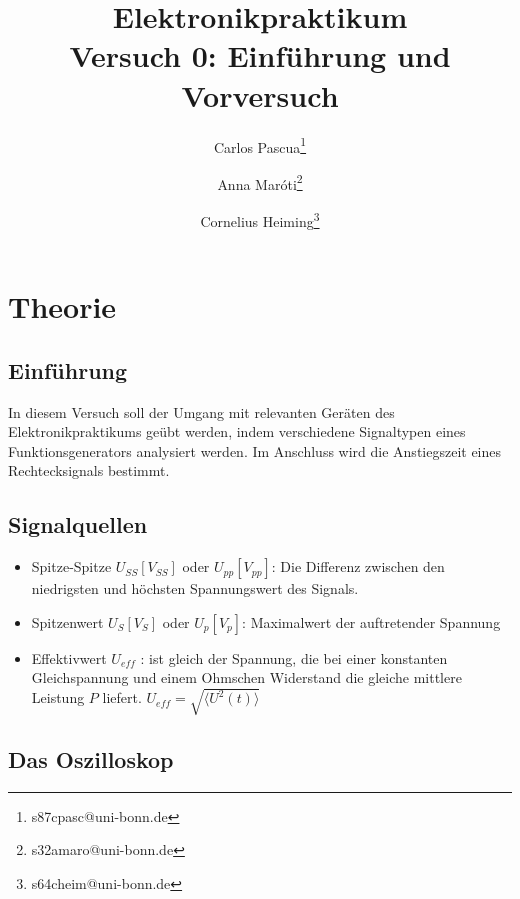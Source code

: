 \documentclass{article}
\begin{document}
\begin{titlepage}
    \title{Elektronikpraktikum \\ Versuch 0: Einführung und Vorversuch}
    \author[1]{Carlos Pascua\thanks{s87cpasc@uni-bonn.de}}
    \author[1]{Anna Maróti\thanks{s32amaro@uni-bonn.de}}
    \author[1]{Cornelius Heiming\thanks{s64cheim@uni-bonn.de}}
\end{titlepage}
\maketitle
\tableofcontents
\newpage
{}

\pagestyle{fancy}
\fancyhead[R]{\thepage}
\fancyhead[L]{\leftmark}

\section{Theorie}

\subsection*{Einführung}
In diesem Versuch soll der Umgang mit  relevanten Geräten des Elektronikpraktikums geübt werden, indem verschiedene Signaltypen eines Funktionsgenerators analysiert werden. Im Anschluss wird die Anstiegszeit eines Rechtecksignals bestimmt.


\subsection*{Signalquellen}
\begin{itemize}
    \item Spitze-Spitze $U_{SS} [V_{SS}]$ oder $U_{pp} [V_{pp}]$: Die Differenz zwischen den niedrigsten und höchsten Spannungswert des Signals.
    \item Spitzenwert $U_{S} [V_{S}]$ oder $U_{p} [V_{p}]$: Maximalwert der auftretender Spannung 
    \item Effektivwert $U_{eff}$ : ist gleich der Spannung, die bei einer konstanten Gleichspannung und einem Ohmschen Widerstand die gleiche mittlere Leistung $P$ liefert. $U_{eff}= \sqrt{\langle U^2(t) \rangle}$
\end{itemize}


\subsection*{Das Oszilloskop}
\end{document}
